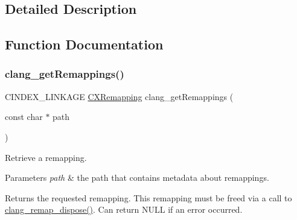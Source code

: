 \subsection{Detailed Description}


\subsection{Function Documentation}
\mbox{\label{group__CINDEX__REMAPPING_ga6388687c77b68fb0e83a393a91625c7f}} 
\subsubsection{\texorpdfstring{clang\+\_\+get\+Remappings()}{clang\_getRemappings()}}
{\footnotesize\ttfamily C\+I\+N\+D\+E\+X\+\_\+\+L\+I\+N\+K\+A\+GE \hyperlink{group__CINDEX__REMAPPING_ga04be0aca9e36a130cf1dd6fd8cbd4408}{C\+X\+Remapping} clang\+\_\+get\+Remappings (\begin{DoxyParamCaption}\item[{const char $\ast$}]{path }\end{DoxyParamCaption})}



Retrieve a remapping. 


\begin{DoxyParams}{Parameters}
{\em path} & the path that contains metadata about remappings.\\
\hline
\end{DoxyParams}
\begin{DoxyReturn}{Returns}
the requested remapping. This remapping must be freed via a call to {\ttfamily \hyperlink{group__CINDEX__REMAPPING_gafbd34560f59e5d3e0f5e746215b12ed7}{clang\+\_\+remap\+\_\+dispose()}}. Can return N\+U\+LL if an error occurred. 
\end{DoxyReturn}
\mbox{\label{group__CINDEX__REMAPPING_gadc19460a19f4f0d3ab8b722dca75b047}} 
